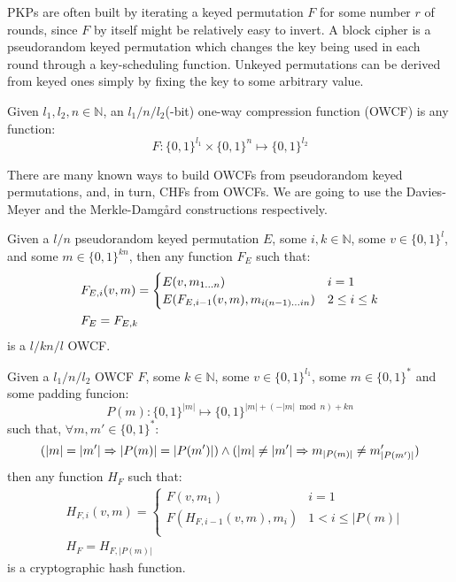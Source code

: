 \noindent PKPs are often built by iterating a keyed permutation \(F\) for some number \(r\) of
rounds, since \(F\) by itself might be relatively easy to invert.
A block cipher is a pseudorandom keyed permutation which changes the key being used in each
round through a key-scheduling function.
Unkeyed permutations can be derived from keyed ones simply by fixing the key to some arbitrary
value.
\begin{definition}
	Given \(l_1, l_2, n \in \mathbb{N}\), an \(l_1/n/l_2\)(-bit) one-way compression function (OWCF)
	is any function:
	\[F\colon {\{0, 1\}}^{l_1} \times {\{0, 1\}}^n \mapsto {\{0, 1\}}^{l_2}\]
\end{definition}

\noindent There are many known ways to build OWCFs from pseudorandom keyed
permutations, and, in turn, CHFs from OWCFs.
We are going to use the Davies-Meyer and the Merkle-Damg\r{a}rd constructions respectively.
\begin{theorem}
	Given a \(l/n\) pseudorandom keyed permutation \(E\), some \(i, k \in \mathbb{N}\), some
	\(v \in {\{0, 1\}}^l\), and some \(m \in {\{0, 1\}}^{kn}\), then any function \(F_E\) such that:
	\begin{align*}
		 & F_{E,i}(v, m) =
		\begin{cases}
			E(v, m_{{{1}\dots{n}}})                      & i = 1         \\
			E(F_{E, i-1}(v, m), m_{{{i(n-1)}\dots{in}}}) & 2 \le i \le k \\
		\end{cases} \\
		 & F_E = F_{E, k}
	\end{align*}
	is a \(l/kn/l\) OWCF\@.
\end{theorem}
\begin{theorem}
	Given a \(l_1/n/l_2\) OWCF \(F\), some \(k \in \mathbb{N}\), some \(v \in {\{0, 1\}}^{l_1}\),
	some \(m \in {\{0, 1\}}^*\) and some padding funcion:
	\[P(m)\colon {\{0, 1\}}^{|m|} \mapsto {\{0, 1\}}^{|m| + (-|m| \bmod n) + kn}\]
	such that, \(\forall m, m' \in {\{0, 1\}}^*\colon \)
	\[(|m| = |m'| \Rightarrow |P(m)| = |P(m')|) \land (|m| \neq |m'| \Rightarrow m_{|P(m)|} \neq m'_{|P(m')|})\]
	then any function \(H_F\) such that:
	\begin{align*}
		 & H_{F, i}(v, m) =
		\begin{cases}
			F(v, m_1)                & i = 1            \\
			F(H_{F, i-1}(v, m), m_i) & 1 < i \le |P(m)| \\
		\end{cases} \\
		 & H_F = H_{F, |P(m)|}
	\end{align*}
	is a cryptographic hash function.
\end{theorem}

